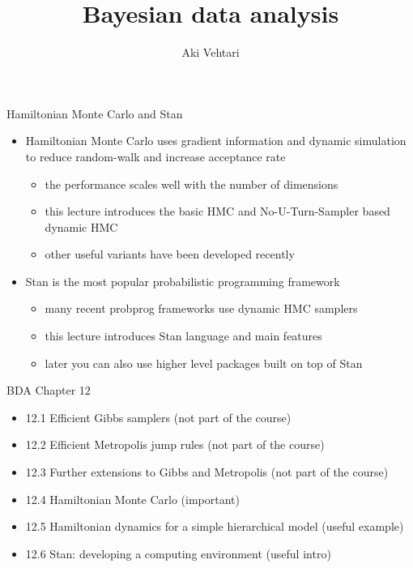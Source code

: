 \documentclass[finnish,english,t]{beamer}
\title[]{Bayesian data analysis}
\subtitle{}
\author{Aki Vehtari}
\institute[Aalto]{}
\begin{document}
\begin{frame}{Hamiltonian Monte Carlo and Stan}

  \begin{itemize}
  \item<+-> Hamiltonian Monte Carlo uses gradient information and dynamic
    simulation to reduce random-walk and increase acceptance rate
    \begin{itemize}
    \item the performance scales well with the number of dimensions
    \item this lecture introduces the basic HMC and No-U-Turn-Sampler
      based dynamic HMC
    \item other useful variants have been developed recently
    \end{itemize}
  \item<+-> Stan is the most popular probabilistic programming framework
    \begin{itemize}
    \item many recent probprog frameworks use dynamic HMC samplers
    \item this lecture introduces Stan language and main features
    \item later you can also use higher level packages built on top of
      Stan
    \end{itemize}
  \end{itemize}

\end{frame}

\begin{frame}{BDA Chapter 12}

  \begin{itemize}
  \item {\color{gray} 12.1 Efficient Gibbs samplers (not part of the course)}
  \item {\color{gray} 12.2 Efficient Metropolis jump rules (not part of the course)}
  \item {\color{gray} 12.3 Further extensions to Gibbs and Metropolis (not part of the course)}
  \item 12.4 Hamiltonian Monte Carlo (important)
  \item 12.5 Hamiltonian dynamics for a simple hierarchical model (useful example)
  \item 12.6 Stan: developing a computing environment (useful intro)
  \end{itemize}
\end{frame}
\end{document}
